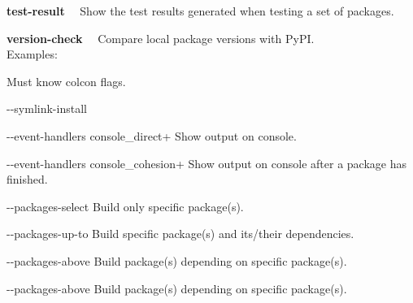 \documentclass[9pt,a4paper]{article}
\newcommand{\colconcmd}[1]{\textbf{\sffamily\color{blue}#1}~~}
\newcommand{\terminalfont}[1]{{\sffamily#1}}
\newcommand{\terminal}[1]{\-\hspace{0.5cm}\terminalfont{\$ #1}}
\newcommand{\ddash}{-{}-}
\begin{document}
\begin{multicols*}{3}[]
%
\colconcmd{test-result} Show the test results generated when testing a set of packages.
%

\hrulefill

%
\colconcmd{version-check} Compare local package versions with PyPI.
\\
Examples:
\\
\terminal{ros2 msg show geometry\_msgs/msg/Pose}
%

\hrulefill

Must know colcon flags.

\terminalfont{\ddash symlink-install}

\terminalfont{\ddash event-handlers console\_direct+}
Show output on console.

\terminalfont{\ddash event-handlers console\_cohesion+}
Show output on console after a package has finished.

\terminalfont{\ddash packages-select}
Build only specific package(s).

\terminalfont{\ddash packages-up-to}
Build specific package(s) and its/their dependencies.

\terminalfont{\ddash packages-above}
Build package(s) depending on specific package(s).

\terminalfont{\ddash packages-above}
Build package(s) depending on specific package(s).

\end{multicols*}
\end{document}
